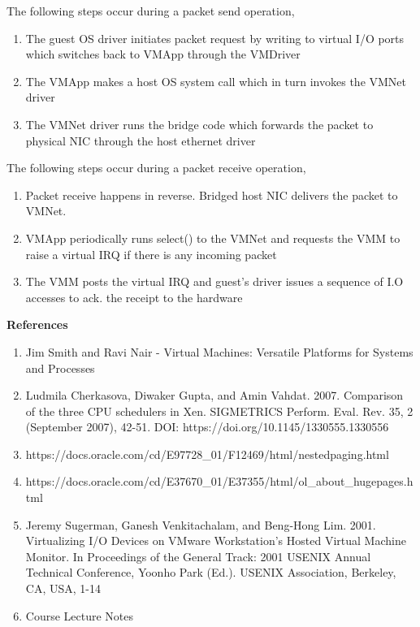 \documentclass[11pt,a4paper,oneside]{article}
\begin{document}
\begin{enumerate}
       The following steps occur during a packet send operation,
       \begin{enumerate}
       	\item The guest OS driver initiates packet request by writing to virtual I/O ports which switches back to VMApp through the VMDriver
       	\item The VMApp makes a host OS system call which in turn invokes the VMNet driver
       	\item The VMNet driver runs the bridge code which forwards the packet to physical NIC through the host ethernet driver 
       \end{enumerate}
   
       The following steps occur during a packet receive operation,
       \begin{enumerate}
       	\item Packet receive happens in reverse. Bridged host NIC delivers the packet to VMNet. 
       	\item VMApp periodically runs select() to the VMNet and requests the VMM to raise a virtual IRQ if there is any incoming packet
       	\item The VMM posts the virtual IRQ and guest's driver issues a sequence of I.O accesses to ack. the receipt to the hardware
       \end{enumerate}
		
		
	        			
	\end{enumerate}
    
    \textbf{References}
    \begin{enumerate}
    	\item Jim Smith and Ravi Nair - Virtual Machines: Versatile Platforms for Systems and Processes 
    	\item Ludmila Cherkasova, Diwaker Gupta, and Amin Vahdat. 2007. Comparison of the three CPU schedulers in Xen. SIGMETRICS Perform. Eval. Rev. 35, 2 (September 2007), 42-51. DOI: https://doi.org/10.1145/1330555.1330556
    	\item https://docs.oracle.com/cd/E97728\_01/F12469/html/nestedpaging.html
    	\item https://docs.oracle.com/cd/E37670\_01/E37355/html/ol\_about\_hugepages.html
    	\item Jeremy Sugerman, Ganesh Venkitachalam, and Beng-Hong Lim. 2001. Virtualizing I/O Devices on VMware Workstation's Hosted Virtual Machine Monitor. In Proceedings of the General Track: 2001 USENIX Annual Technical Conference, Yoonho Park (Ed.). USENIX Association, Berkeley, CA, USA, 1-14
    	\item Course Lecture Notes   	
    \end{enumerate}
 

    
\end{document}
